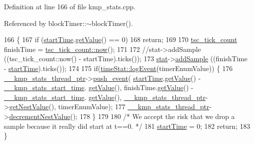 Definition at line 166 of file kmp\-\_\-stats.\-cpp.



Referenced by block\-Timer\-::$\sim$block\-Timer().


\begin{DoxyCode}
166                                                \{
167     \textcolor{keywordflow}{if} (\hyperlink{classexplicitTimer_ad457d205b0b6d5309f65514e438992d2}{startTime}.\hyperlink{classtsc__tick__count_a88c80c6a9d8b3b0d76b45cef2d3bc36b}{getValue}() == 0)
168         \textcolor{keywordflow}{return};
169 
170     \hyperlink{classtsc__tick__count}{tsc\_tick\_count} finishTime = \hyperlink{classtsc__tick__count_a0caca1efab64714976683134bcdd99b4}{tsc\_tick\_count::now}();
171 
172     \textcolor{comment}{//stat->addSample ((tsc\_tick\_count::now() - startTime).ticks());}
173     \hyperlink{classexplicitTimer_afba814013964a74c3142ffde95f8ba1f}{stat}->\hyperlink{classstatistic_a608058fd5fac27c72c6019c607f38688}{addSample} ((finishTime - \hyperlink{classexplicitTimer_ad457d205b0b6d5309f65514e438992d2}{startTime}).ticks());
174 
175     \textcolor{keywordflow}{if}(\hyperlink{classtimeStat_ab45f55ba382e1ac2018ed6ab3612d3b1}{timeStat::logEvent}(timerEnumValue)) \{
176         \hyperlink{kmp__global_8c_ae8b6bdb1368ab875fdb8322ba2de5803}{\_\_kmp\_stats\_thread\_ptr}->\hyperlink{classkmp__stats__list_aa342e93ee4681eae6f8ab145ead4c31f}{push\_event}(
      \hyperlink{classexplicitTimer_ad457d205b0b6d5309f65514e438992d2}{startTime}.\hyperlink{classtsc__tick__count_a88c80c6a9d8b3b0d76b45cef2d3bc36b}{getValue}() - \hyperlink{kmp__global_8c_a12d1cf26d9330e0eb6361b6d67086d1d}{\_\_kmp\_stats\_start\_time}.
      \hyperlink{classtsc__tick__count_a88c80c6a9d8b3b0d76b45cef2d3bc36b}{getValue}(), finishTime.\hyperlink{classtsc__tick__count_a88c80c6a9d8b3b0d76b45cef2d3bc36b}{getValue}() - \hyperlink{kmp__global_8c_a12d1cf26d9330e0eb6361b6d67086d1d}{\_\_kmp\_stats\_start\_time}.
      \hyperlink{classtsc__tick__count_a88c80c6a9d8b3b0d76b45cef2d3bc36b}{getValue}(), \hyperlink{kmp__global_8c_ae8b6bdb1368ab875fdb8322ba2de5803}{\_\_kmp\_stats\_thread\_ptr}->\hyperlink{classkmp__stats__list_ad84d6680e0777851ae04a175f858addc}{getNestValue}(), 
      timerEnumValue); 
177         \hyperlink{kmp__global_8c_ae8b6bdb1368ab875fdb8322ba2de5803}{\_\_kmp\_stats\_thread\_ptr}->\hyperlink{classkmp__stats__list_a9a27398f0f242283d1f9c8afa1b32bab}{decrementNestValue}();
178     \}
179 
180     \textcolor{comment}{/* We accept the risk that we drop a sample because it really did start at t==0. */}
181     \hyperlink{classexplicitTimer_ad457d205b0b6d5309f65514e438992d2}{startTime} = 0; 
182     \textcolor{keywordflow}{return};
183 \}
\end{DoxyCode}


